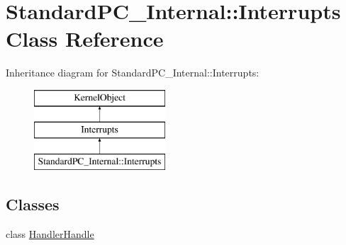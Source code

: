 \hypertarget{class_standard_p_c___internal_1_1_interrupts}{}\section{Standard\+P\+C\+\_\+\+Internal\+:\+:Interrupts Class Reference}
\label{class_standard_p_c___internal_1_1_interrupts}
Inheritance diagram for Standard\+P\+C\+\_\+\+Internal\+:\+:Interrupts\+:\begin{figure}[H]
\begin{center}
\leavevmode
\includegraphics[height=3.000000cm]{class_standard_p_c___internal_1_1_interrupts}
\end{center}
\end{figure}
\subsection*{Classes}
\begin{DoxyCompactItemize}
\item 
class \hyperlink{class_standard_p_c___internal_1_1_interrupts_1_1_handler_handle}{Handler\+Handle}
\end{DoxyCompactItemize}
